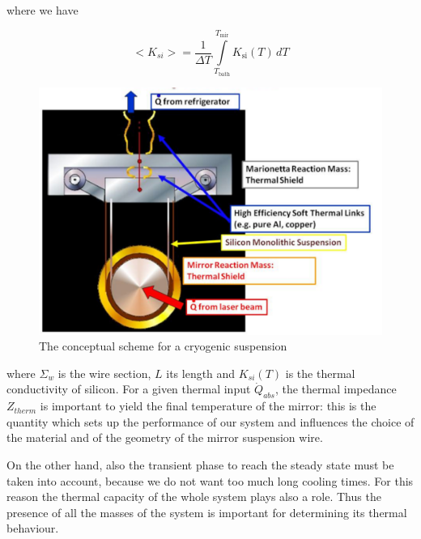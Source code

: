 \noindent 
where we have

\begin{equation}
 <K_{si}> = \frac{1} {{\Delta T}}\int\limits_{{T_\text{bath}}}^{{T_\text{mir}}} {{K_\text{si}}(T) \, dT}
\label{eq1_bis}
\end{equation}

\begin{figure}[htbp]
\begin{center}
 \includegraphics[width=17cm]{Sec_Suspensions/Figures/scheme.pdf}
			\caption{The conceptual scheme for a cryogenic suspension}
\label{fig:scheme}
\end{center}
\end{figure}



\noindent
where $\Sigma_w$ is the wire section, $L$ its length and $K_{si}(T)$ is the thermal conductivity of silicon. For a given thermal input $\dot{Q}_{abs}$, the thermal impedance $Z_{therm}$ is important to yield the final temperature of the mirror: this is the quantity which sets up the performance of our system and influences the choice of the material and of the geometry of the mirror suspension wire.

On the other hand, also the transient phase to reach the steady state must be taken into account, because we do not want too much long cooling times. For this reason the thermal capacity of the whole system plays also a role. Thus the presence of all the masses of the system is important for determining its thermal behaviour. 

